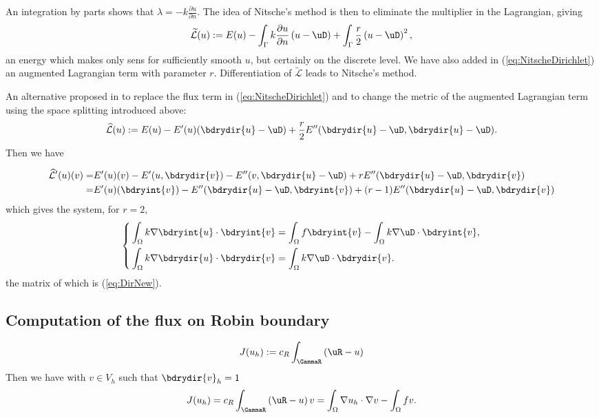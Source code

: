 An integration by parts shows that $\lambda=-k\frac{\partial u}{\partial n}$.
The idea of Nitsche's method is then to eliminate the multiplier in the Lagrangian, giving
%
\begin{equation}\label{eq:NitscheDirichlet}
\widetilde{\mathcal L}(u) := E(u) - \int_{\Gamma}k\frac{\partial u}{\partial n}\left(u-\uD\right)
+\int_{\Gamma}\frac{r}{2}\left(u-\uD\right)^2, 
\end{equation}
%
an energy which makes only sens for sufficiently smooth $u$, but certainly on the discrete level.
We have also added in (\ref{eq:NitscheDirichlet}) an augmented Lagrangian term with parameter $r$.
Differentiation of $\widetilde{\mathcal L}$ leads to Nitsche's method.

An alternative proposed in \cite{Becker18} to replace the flux term in (\ref{eq:NitscheDirichlet}) 
and to change the metric of the augmented Lagrangian term using the space splitting introduced above:
%
\begin{equation}\label{eq:NewNitscheDirichlet}
\widehat{\mathcal L}(u) := E(u) -E'(u)(\bdrydir{u}-\uD) + \frac{r}{2} E''(\bdrydir{u}-\uD,\bdrydir{u}-\uD).
\end{equation}
%
Then we have

%
\begin{align*}
\widehat{\mathcal L}'(u)(v) =& E'(u)(v) - E'(u,\bdrydir{v}) - E''(v,\bdrydir{u}-\uD) + r E''(\bdrydir{u}-\uD, \bdrydir{v})\\
=& E'(u)(\bdryint{v}) - E''(\bdrydir{u}-\uD, \bdryint{v}) + (r-1)E''(\bdrydir{u}-\uD, \bdrydir{v})
\end{align*}
%
which gives the system, for $r=2$,
%
\begin{align*}
%
\left\{
\begin{aligned}
&\int_{\Omega}k\nabla \bdryint{u}\cdot \bdryint{v} = \int_{\Omega}f\bdryint{v} -\int_{\Omega}k\nabla \uD\cdot \bdryint{v},\\
&\int_{\Omega}k\nabla \bdrydir{u}\cdot \bdrydir{v} = \int_{\Omega}k\nabla \uD\cdot \bdrydir{v}.
\end{aligned}
\right.
%
\end{align*}
%
the matrix of which is (\ref{eq:DirNew}).
%
\subsection{Computation of the flux on Robin boundary}\label{subsec:PoissonP1Dirichlet}
%
%
\begin{equation}\label{eq:}
J(u_h) := c_R\int_{\GammaR}\left(\uR-u\right)
\end{equation}
% 
Then we have with $v\in V_h$ such that $\bdrydir{v}_h=1$
%
\begin{align*}
J(u_h) = c_R\int_{\GammaR}\left(\uR-u\right)v = \int_{\Omega}\nabla u_h\cdot\nabla v - \int_{\Omega}fv.
\end{align*}
%

